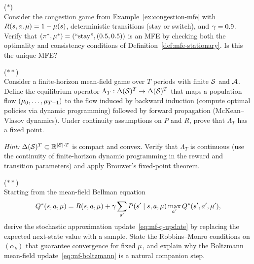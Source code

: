 \documentclass[11pt,a4paper]{article}
\begin{document}
\begin{exercise}
\textnormal{(\(*\))} \\
Consider the congestion game from Example~\ref{ex:congestion-mfe}
with $R(s, a, \mu) = 1 - \mu(s)$, deterministic
transitions (stay or switch), and $\gamma = 0.9$.  Verify that
$(\pi^*, \mu^*) = (\text{``stay''}, (0.5, 0.5))$ is
an MFE by checking both the optimality and consistency conditions
of Definition~\ref{def:mfe-stationary}.  Is this the unique MFE?
\end{exercise}

\begin{exercise}
\textnormal{(\(**\))} \\
Consider a finite-horizon mean-field game over $T$ periods with
finite $\mathcal{S}$ and $\mathcal{A}$.  Define the equilibrium operator
$\Lambda_T: \Delta(\mathcal{S})^T \to \Delta(\mathcal{S})^T$ that maps
a population flow $(\mu_0, \ldots, \mu_{T-1})$ to the
flow induced by backward induction (compute optimal policies via
dynamic programming) followed by forward propagation (McKean--Vlasov
dynamics).  Under continuity assumptions on $P$ and $R$, prove that
$\Lambda_T$ has a fixed point.

\textit{Hint:} $\Delta(\mathcal{S})^T \subset \mathbb{R}^{|\mathcal{S}| \cdot T}$
is compact and convex.  Verify that $\Lambda_T$ is continuous
(use the continuity of finite-horizon dynamic programming in the
reward and transition parameters) and apply Brouwer's fixed-point
theorem.
\end{exercise}

\begin{exercise}
\textnormal{(\(**\))} \\
Starting from the mean-field Bellman equation
\[
  Q^*(s, a, \mu) = R(s,a,\mu) + \gamma
  \sum_{s'} P(s' \mid s, a, \mu) \max_{a'} Q^*(s', a',
  \mu'),
\]
derive the stochastic approximation update~\eqref{eq:mf-q-update}
by replacing the expected next-state value with a sample.  State
the Robbins--Monro conditions on $(\alpha_k)$ that guarantee
convergence for fixed $\mu$, and explain why the Boltzmann
mean-field update~\eqref{eq:mf-boltzmann} is a natural companion
step.
\end{exercise}
\end{document}

